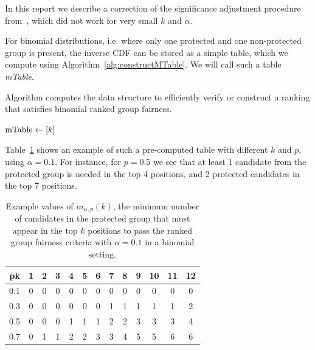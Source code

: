 
In this report we describe a correction of the significance adjustment procedure from~\cite{zehlike2017fair}, which did not work for very small $k$ and $\alpha$.

For binomial distributions, i.e. where only one protected and one non-protected group is present, the inverse CDF can be stored as a simple table, which we compute using Algorithm~\ref{alg:constructMTable}.
%
We will call such a table \textit{mTable}.
%
\begin{algorithm}[h]
	\caption{Algorithm \algoMtable computes the data structure to efficiently verify or construct a ranking that satisfies binomial ranked group fairness.}
	\label{alg:constructMTable}
	\small
	$\operatorname{mTable} \leftarrow [k]$ 
	\Return{$ \mtable $ }
\end{algorithm}

Table~\ref{tbl:ranked_group_fairness_table} shows an example of such a pre-computed table with different $ k $ and $ p $, using $\alpha=0.1$.
%
For instance, for $p=0.5$ we see that at least 1 candidate from the protected group is needed in the top 4 positions, and 2 protected candidates in the top 7 positions.
\begin{table}[h!]
	\small\begin{tabular}{r|cccccccccccc}
		\diaghead{some text}%
		{p}{k}&
		1 & 2 & 3 & 4 & 5 & 6 & 7 & 8 & 9 & 10 & 11 & 12 \\ \midrule
		0.1      & 0 & 0 & 0 & 0 & 0 & 0 & 0 & 0 & 0 & 0  &  0 &  0 \\
		0.3      & 0 & 0 & 0 & 0 & 0 & 0 & 1 & 1 & 1 & 1  &  1 &  2 \\
		0.5      & 0 & 0 & 0 & 1 & 1 & 1 & 2 & 2 & 3 & 3  &  3 &  4 \\
		0.7      & 0 & 1 & 1 & 2 & 2 & 3 & 3 & 4 & 5 & 5  &  6 &  6 \\
		\bottomrule
	\end{tabular}
	\caption{Example values of $m_{\alpha,p}(k)$, the minimum number of candidates in the protected group that must appear in the top $k$ positions to pass the ranked group fairness criteria with $\alpha=0.1$ in a binomial setting.}
	\label{tbl:ranked_group_fairness_table}
\end{table}

